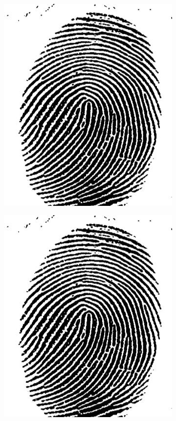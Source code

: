 \documentclass{article}
\begin{document}
\begin{figure}[htbp]
\begin{subfigure}{.32\textwidth}
        \includegraphics[width=\linewidth]{img/global-threshold.png}
    \end{subfigure}
    \begin{subfigure}{.32\textwidth}
        \includegraphics[width=\linewidth]{img/otsu-threshold.png}

\end{subfigure}
\end{figure}
\end{document}
